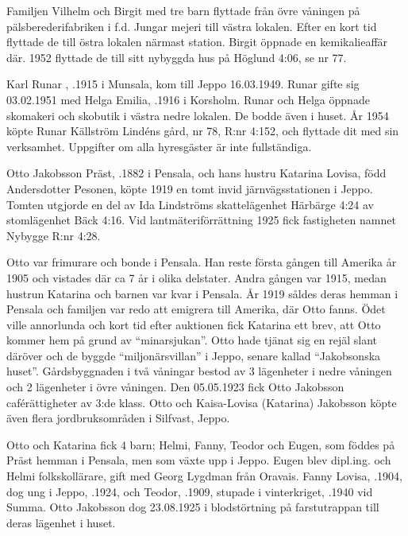 Familjen Vilhelm och Birgit  med tre barn flyttade från övre våningen på pälsberederifabriken i f.d. Jungar mejeri till västra lokalen. Efter en kort tid flyttade de till östra lokalen närmast station. Birgit öppnade en kemikalieaffär där. 1952 flyttade de till sitt nybyggda hus på Höglund 4:06, se nr 77.

Karl Runar , .1915 i Munsala, kom till Jeppo 16.03.1949. Runar gifte sig 03.02.1951 med Helga Emilia, .1916 i Korsholm. Runar och Helga öppnade skomakeri och skobutik i västra nedre lokalen. De bodde även i huset. År 1954 köpte Runar Källström Lindéns gård, nr 78, R:nr 4:152, och flyttade dit med sin verksamhet.
Uppgifter om alla hyresgäster är inte fullständiga.


Otto Jakobsson Präst, .1882 i Pensala, och hans hustru Katarina Lovisa, född Andersdotter Pesonen, köpte 1919 en tomt invid järnvägsstationen i Jeppo. Tomten utgjorde en del av Ida Lindströms skattelägenhet Härbärge 4:24 av stomlägenhet Bäck 4:16. Vid lantmäteriförrättning 1925 fick fastigheten namnet Nybygge R:nr 4:28.

Otto var frimurare och bonde i Pensala. Han reste första gången till Amerika år 1905 och vistades där ca 7 år i olika delstater. Andra gången var 1915, medan hustrun Katarina och barnen var kvar i Pensala. År 1919 såldes deras hemman i Pensala och familjen var redo att emigrera till Amerika, där Otto fanns. Ödet ville annorlunda och kort tid efter auktionen fick Katarina ett brev, att Otto kommer hem på grund av ``minarsjukan''. Otto hade tjänat sig en rejäl slant däröver och de byggde ``miljonärsvillan'' i Jeppo, senare kallad ``Jakobsonska huset''.  Gårdsbyggnaden i två våningar  bestod av 3 lägenheter i nedre våningen och 2 lägenheter i övre våningen. Den 05.05.1923 fick Otto Jakobsson caférättigheter av 3:de klass. Otto och Kaisa-Lovisa (Katarina) Jakobsson köpte även flera jordbruksområden i Silfvast, Jeppo.

Otto och Katarina fick 4 barn; Helmi, Fanny, Teodor och Eugen, som föddes på Präst hemman i Pensala, men som växte upp i Jeppo. Eugen blev dipl.ing. och Helmi folkskollärare, gift med Georg Lygdman från Oravais. Fanny Lovisa, .1904, dog ung i Jeppo, .1924, och Teodor, .1909, stupade i vinterkriget, .1940 vid Summa. Otto Jakobsson dog 23.08.1925 i blodstörtning på farstutrappan till deras lägenhet i huset.



